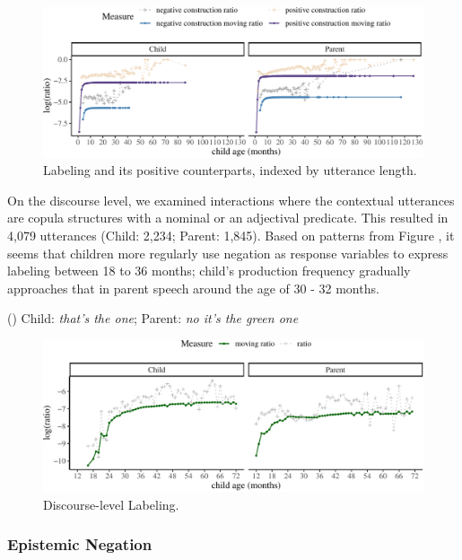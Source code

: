 \documentclass[
  english,
  man,floatsintext]{apa6}
\begin{document}
\begin{figure}[H]

{\centering \includegraphics{neg_construction_article_files/figure-latex/learningul-1} 

}

\caption{Labeling and its positive counterparts, indexed by utterance length.}\label{fig:learningul}
\end{figure}

On the discourse level, we examined interactions where the contextual utterances are copula structures with a nominal or an adjectival predicate. This resulted in 4,079 utterances (Child: 2,234; Parent: 1,845). Based on patterns from Figure , it seems that children more regularly use negation as response variables to express labeling between 18 to 36 months; child's production frequency gradually approaches that in parent speech around the age of 30 - 32 months.

() Child: \emph{that's the one}; Parent: \emph{no it's the green one}

\begin{figure}[H]

{\centering \includegraphics{neg_construction_article_files/figure-latex/learningdiscourse-1} 

}

\caption{Discourse-level Labeling.}\label{fig:learningdiscourse}
\end{figure}

\hypertarget{epistemic-negation}{%
\subsubsection{Epistemic Negation}\label{epistemic-negation}}
\end{document}
